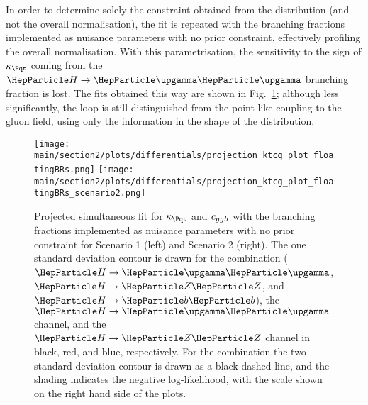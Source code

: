 In order to determine solely the constraint obtained from the distribution (and not the overall normalisation), the fit is repeated with the branching fractions implemented as nuisance parameters with no prior constraint, effectively profiling the overall normalisation.
% 
With this parametrisation, the sensitivity to the sign of $\kappat$ coming from the $\hgg$ branching fraction is lost.
% 
The fits obtained this way are shown in Fig.~\ref{fig:ktcg_floatingBRs}; although less significantly, the loop is still distinguished from the point-like coupling to the gluon field, using only the information in the shape of the distribution.

\begin{figure}[hbtp]
  \begin{center}
    \texttt{[image: \\main/section2/plots/differentials/projection\_ktcg\_plot\_floatingBRs.png]}
    \texttt{[image: \\main/section2/plots/differentials/projection\_ktcg\_plot\_floatingBRs\_scenario2.png]}
    \caption{
        Projected simultaneous fit for $\kappat$ and $c_{ggh}$ with the branching fractions implemented as nuisance parameters with no prior constraint for Scenario 1 (left) and Scenario 2 (right).
        The one standard deviation contour is drawn for the combination ($\hgg$, $\hzz$, and $\hbb$), the $\hgg$ channel, and the $\hzz$ channel in black, red, and blue, respectively.
        For the combination the two standard deviation contour is drawn as a black dashed line, and the shading indicates the negative log-likelihood, with the scale shown on the right hand side of the plots.
        }
    \label{fig:ktcg_floatingBRs}
  \end{center}
\end{figure}




